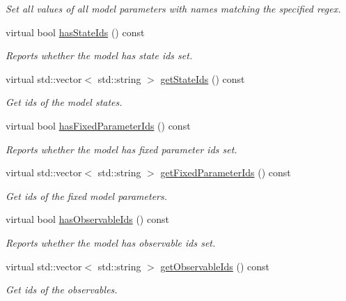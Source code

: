 \begin{DoxyCompactItemize}
\begin{DoxyCompactList}\small\item\em Set all values of all model parameters with names matching the specified regex. \end{DoxyCompactList}\item 
virtual bool \mbox{\hyperlink{classamici_1_1_model_aa249cbfe9223101f4492ace0b14e4eab}{has\+State\+Ids}} () const
\begin{DoxyCompactList}\small\item\em Reports whether the model has state ids set. \end{DoxyCompactList}\item 
virtual std\+::vector$<$ std\+::string $>$ \mbox{\hyperlink{classamici_1_1_model_a8a93b9fcddaaa762dacc654ffc379af1}{get\+State\+Ids}} () const
\begin{DoxyCompactList}\small\item\em Get ids of the model states. \end{DoxyCompactList}\item 
virtual bool \mbox{\hyperlink{classamici_1_1_model_af6cb68d368b1288fa0d7515242bf7a5b}{has\+Fixed\+Parameter\+Ids}} () const
\begin{DoxyCompactList}\small\item\em Reports whether the model has fixed parameter ids set. \end{DoxyCompactList}\item 
virtual std\+::vector$<$ std\+::string $>$ \mbox{\hyperlink{classamici_1_1_model_a802aef820cb7ddabfb6330abba320bcf}{get\+Fixed\+Parameter\+Ids}} () const
\begin{DoxyCompactList}\small\item\em Get ids of the fixed model parameters. \end{DoxyCompactList}\item 
virtual bool \mbox{\hyperlink{classamici_1_1_model_adb0d2d3b3aa9cd648efa3cf408d9abab}{has\+Observable\+Ids}} () const
\begin{DoxyCompactList}\small\item\em Reports whether the model has observable ids set. \end{DoxyCompactList}\item 
virtual std\+::vector$<$ std\+::string $>$ \mbox{\hyperlink{classamici_1_1_model_a13ff6d42168b4c62dedd27e274bf3192}{get\+Observable\+Ids}} () const
\begin{DoxyCompactList}\small\item\em Get ids of the observables. \end{DoxyCompactList}\item 

\end{DoxyCompactItemize}
